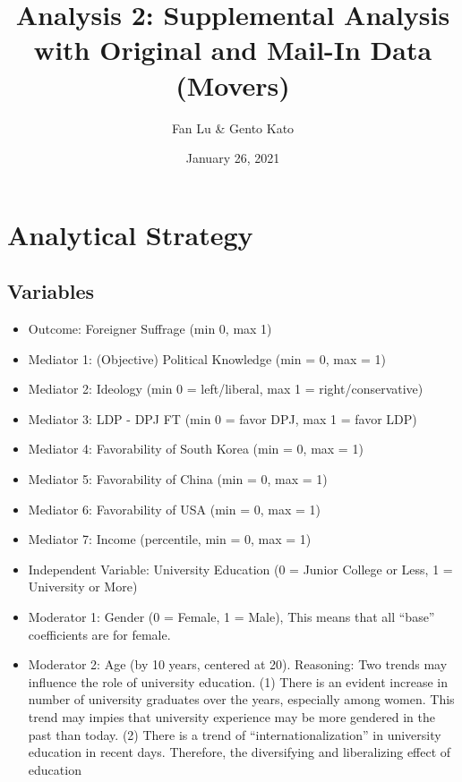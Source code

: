 \documentclass[
]{article}
\title{Analysis 2: Supplemental Analysis with Original and Mail-In Data
(Movers)}
\author{Fan Lu \& Gento Kato}
\date{January 26, 2021}
\begin{document}
\maketitle

\hypertarget{analytical-strategy}{%
\section{Analytical Strategy}\label{analytical-strategy}}

\hypertarget{variables}{%
\subsection{Variables}\label{variables}}

\begin{itemize}
\item
  Outcome: Foreigner Suffrage (min 0, max 1)
\item
  Mediator 1: (Objective) Political Knowledge (min = 0, max = 1)
\item
  Mediator 2: Ideology (min 0 = left/liberal, max 1 =
  right/conservative)
\item
  Mediator 3: LDP - DPJ FT (min 0 = favor DPJ, max 1 = favor LDP)
\item
  Mediator 4: Favorability of South Korea (min = 0, max = 1)\\
\item
  Mediator 5: Favorability of China (min = 0, max = 1)\\
\item
  Mediator 6: Favorability of USA (min = 0, max = 1)\\
\item
  Mediator 7: Income (percentile, min = 0, max = 1)
\item
  Independent Variable: University Education (0 = Junior College or
  Less, 1 = University or More)
\item
  Moderator 1: Gender (0 = Female, 1 = Male), This means that all
  ``base'' coefficients are for female.
\item
  Moderator 2: Age (by 10 years, centered at 20). Reasoning: Two trends
  may influence the role of university education. (1) There is an
  evident increase in number of university graduates over the years,
  especially among women. This trend may impies that university
  experience may be more gendered in the past than today. (2) There is a
  trend of ``internationalization'' in university education in recent
  days. Therefore, the diversifying and liberalizing effect of education

\end{itemize}
\end{document}
